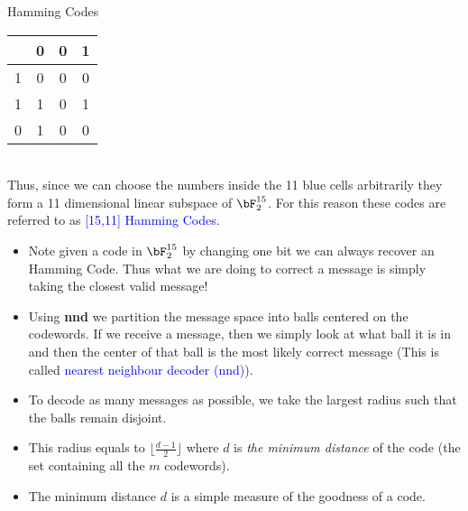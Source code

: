 \begin{frame}{Hamming Codes}
\begin{minipage}{0.25\textwidth}
\begin{tabular}{|c|c|c|c|}
            \hline
            &  \cellcolor{red!20} 0 & \cellcolor{red!20} 0 & \cellcolor{blue!20}  1 \\ \hline
            \cellcolor{red!20} 1 & \cellcolor{blue!20} 0 & \cellcolor{blue!20}  0 & \cellcolor{blue!20} 0  \\ \hline
            \cellcolor{red!20} 1 & \cellcolor{blue!20} 1 &\cellcolor{blue!20}  0 &\cellcolor{blue!20} 1  \\ \hline
             \rowcolor{blue!20}0 & 1 & 0 & 0  \\ \hline
        \end{tabular}
    \end{minipage} \\
\bigskip
     Thus, since we can choose the numbers inside the 11 blue cells arbitrarily they form a 11 dimensional linear subspace of $\bF_2^{15}$.  For this reason these codes are referred to as \textcolor{blue}{[15,11] Hamming Codes}.
     
\end{frame}

\begin{frame}
\begin{itemize}
    \item Note given a code in \(\bF^{15}_2\) by changing one bit we can always recover an Hamming Code. Thus what we are doing to correct a message is simply taking the closest valid message! 

    \item Using \textbf{nnd} we partition the message space into balls centered on the codewords. If we receive a message, then we simply look at what ball it is in and then the center of that ball is the most likely correct message (This is called \textcolor{blue}{nearest neighbour decoder (nnd)}).
    
    \item To decode as many messages as possible, we take the largest radius such that the balls remain disjoint. 
    \item This radius equals to \( \lfloor \frac{d-1}{2}\rfloor\) where \(d\) is \emph{the minimum distance} of the code (the set containing all the \(m\) codewords).

    \item The minimum distance \(d\) is a simple measure of the goodness of a code.
    
    
   

    
\end{itemize}

\end{frame}

